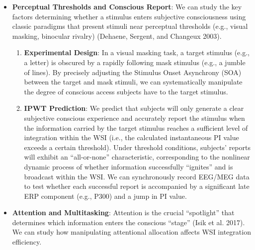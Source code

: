 \documentclass[
  a4paper]{article}
\providecommand{\tightlist}{%
  \setlength{\itemsep}{0pt}\setlength{\parskip}{0pt}}
\begin{document}
\begin{itemize}
\item
  \textbf{Perceptual Thresholds and Conscious Report}: We can study the
  key factors determining whether a stimulus enters subjective
  consciousness using classic paradigms that present stimuli near
  perceptual thresholds (e.g., visual masking, binocular rivalry)
  (Dehaene, Sergent, and Changeux 2003).

  \begin{enumerate}
  \def\labelenumi{\arabic{enumi}.}
  \tightlist
  \item
    \textbf{Experimental Design}: In a visual masking task, a target
    stimulus (e.g., a letter) is obscured by a rapidly following mask
    stimulus (e.g., a jumble of lines). By precisely adjusting the
    Stimulus Onset Asynchrony (SOA) between the target and mask stimuli,
    we can systematically manipulate the degree of conscious access
    subjects have to the target stimulus.
  \item
    \textbf{IPWT Prediction}: We predict that subjects will only
    generate a clear subjective conscious experience and accurately
    report the stimulus when the information carried by the target
    stimulus reaches a sufficient level of integration within the WSI
    (i.e., the calculated instantaneous PI value exceeds a certain
    threshold). Under threshold conditions, subjects' reports will
    exhibit an ``all-or-none'' characteristic, corresponding to the
    nonlinear dynamic process of whether information successfully
    ``ignites'' and is broadcast within the WSI. We can synchronously
    record EEG/MEG data to test whether each successful report is
    accompanied by a significant late ERP component (e.g., P300) and a
    jump in PI value.
  \end{enumerate}
\item
  \textbf{Attention and Multitasking}: Attention is the crucial
  ``spotlight'' that determines which information enters the conscious
  ``stage'' (Isik et al. 2017). We can study how manipulating
  attentional allocation affects WSI integration efficiency.


\end{itemize}
\end{document}
